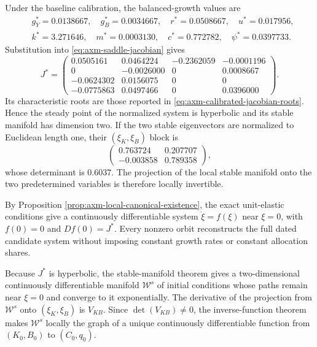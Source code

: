 Under the baseline calibration, the balanced-growth values are
\begin{align*}
 &g_Y^*=0.0138667,\quad g_B^*=0.0034667,\quad r^*=0.0508667,
 \quad u^*=0.017956,\\
 &k^*=3.271646,\quad m^*=0.0003130,\quad c^*=0.772782,
 \quad \psi^*=0.0397733.
\end{align*}
Substitution into \eqref{eq:axm-saddle-jacobian} gives
\begin{equation}
 J^*=\begin{pmatrix}
  0.0505161& 0.0464224&-0.2362059&-0.0001196\\
  0        &-0.0026000& 0        & 0.0008667\\
 -0.0624302& 0.0156075& 0        & 0\\
 -0.0775863& 0.0497466& 0        & 0.0396000
 \end{pmatrix}.
 \label{eq:axm-calibrated-saddle-jacobian}
\end{equation}
Its characteristic roots are those reported in
\eqref{eq:axm-calibrated-jacobian-roots}. Hence the steady point of the
normalized system is hyperbolic and its stable manifold has dimension two. If
the two stable eigenvectors are normalized to Euclidean length one, their
\((\xi_K,\xi_B)\) block is
\[
 \begin{pmatrix}
 0.763724&0.207707\\
 -0.003858&0.789358
 \end{pmatrix},
\]
whose determinant is \(0.6037\). The projection of the local stable manifold
onto the two predetermined variables is therefore locally invertible.

By Proposition \ref{prop:axm-local-canonical-existence}, the exact unit-elastic
conditions give a continuously differentiable system
\(\dot\xi=f(\xi)\) near \(\xi=0\), with \(f(0)=0\) and \(Df(0)=J^*\).
Every nonzero orbit reconstructs the full dated candidate system without
imposing constant growth rates or constant allocation shares.

Because \(J^*\) is hyperbolic, the stable-manifold theorem gives a
two-dimensional continuously differentiable manifold \(\mathcal W^s\) of
initial conditions whose paths remain near \(\xi=0\) and converge to it
exponentially. The derivative of the projection from \(\mathcal W^s\) onto
\((\xi_K,\xi_B)\) is \(V_{KB}\). Since \(\det(V_{KB})\ne0\), the
inverse-function theorem makes \(\mathcal W^s\) locally the graph of a unique
continuously differentiable function from \((K_0,B_0)\) to \((C_0,q_0)\).

